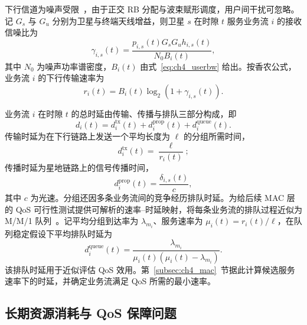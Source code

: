 下行信道为噪声受限~\cite{liu-reconfigurableRAN-TCCN25}，由于正交 RB 分配与波束赋形调度，用户间干扰可忽略。记 $G_s$ 与 $G_u$ 分别为卫星与终端天线增益，则卫星 $s$ 在时隙 $t$ 服务业务流 $i$ 的接收信噪比为
\begin{equation}\label{eq:ch4_snr}
\gamma_{i,s}(t)=\frac{p_{i,s}(t)G_sG_uh_{i,s}(t)}{N_0B_i(t)},
\end{equation}
其中 $N_0$ 为噪声功率谱密度，$B_i(t)$ 由式~\eqref{eq:ch4_userbw} 给出。按香农公式，业务流 $i$ 的下行传输速率为
\begin{equation}\label{eq:ch4_rate}
r_i(t)=B_i(t)\log_2\!\left(1+\gamma_{i,s}(t)\right).
\end{equation}

业务流 $i$ 在时隙 $t$ 的总时延由传输、传播与排队三部分构成，即
\begin{equation}\label{eq:ch4_delay}
d_i(t)=d_i^\text{tx}(t)+d_i^\text{prop}(t)+d_i^\text{queue}(t).
\end{equation}
传输时延为在下行链路上发送一个平均长度为 $\ell$ 的分组所需时间，
\begin{equation}\label{eq:ch4_txdelay}
d_i^\text{tx}(t)=\frac{\ell}{r_i(t)};
\end{equation}
传播时延为星地链路上的信号传播时间，
\begin{equation}\label{eq:ch4_propdelay}
d_i^\text{prop}(t)=\frac{\delta_{i,s}(t)}{c},
\end{equation}
其中 $c$ 为光速。分组还因多条业务流间的竞争经历排队时延。为给后续 MAC 层的 QoS 可行性测试提供可解析的速率--时延映射，将每条业务流的排队过程近似为 M/M/1 队列~\cite{Li-DelayConstrainedCapacity-TWC23}。记平均分组到达率为 $\lambda_{m_i}$、服务速率为 $\mu_i(t)=r_i(t)/\ell$，在队列稳定假设下平均排队时延为
\begin{equation}\label{eq:ch4_queuedelay}
d_i^\text{queue}(t)=\frac{\lambda_{m_i}}{\mu_i(t)\left(\mu_i(t)-\lambda_{m_i}\right)}.
\end{equation}
该排队时延用于近似评估 QoS 效用。第~\ref{subsec:ch4_mac}~节据此计算候选服务速率下的时延，并确定业务流满足 QoS 所需的最小速率。

\subsection{长期资源消耗与 QoS 保障问题}
\label{subsec:ch4_problem}

